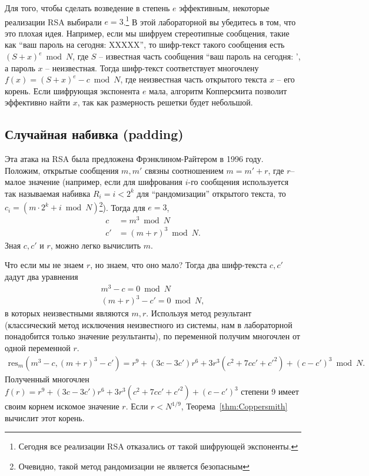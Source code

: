 \documentclass[11pt]{exam}
\theoremstyle{definition}
\begin{document}
{	Для того, чтобы сделать возведение в степень $e$ эффективным, некоторые реализации RSA выбирали $e=3$.\footnote{Сегодня все реализации RSA отказались от такой шифрующей экспоненты.} В этой лабораторной вы убедитесь в том, что это плохая идея. Например, если мы шифруем стереотипные сообщения, такие как ``ваш пароль на сегодня: XXXXX'', то шифр-текст такого сообщения есть $(S+x)^e \bmod N$, где $S$ -- известная часть сообщения ``ваш пароль на сегодня: ', а пароль $x$ -- неизвестная. Тогда шифр-текст соответствует многочлену $f(x) = (S+x)^e - c \bmod N$, где неизвестная часть открытого текста $x$ -- его корень. Если шифрующая экспонента $e$ мала, алгоритм Копперсмита позволит эффективно найти $x$, так как размерность решетки будет небольшой. 
	
	 
	\subsection{Случайная набивка (padding)}
	
	Эта атака на RSA была предложена Фрэнклином-Райтером в 1996 году.  Положим, открытые сообщения $m,m'$ связны соотношением $m = m'+r$, где $r$-- малое значение (например, если для шифрования $i$-го сообщения используется так называемая набивка $R_i = i < 2^k$ для ``рандомизации'' открытого текста, то $c_i = (m\cdot 2^k + i \bmod N)$\footnote{Очевидно, такой метод рандомизации не является безопасным}). Тогда для $e = 3$,
	\begin{align*}
		c &= m^3 \bmod N \\
		c' &=(m+r)^3 \bmod N.
	\end{align*}
	Зная $c, c'$ и $r$, можно легко вычислить $m$. 
	
	Что если мы не знаем $r$, но знаем, что оно мало? Тогда два шифр-текста $c, c'$ дадут два уравнения 
	\begin{align*}
	m^3 - c = 0 \bmod N \\
	(m+r)^3 - c' = 0\bmod N,
	\end{align*}
	в которых неизвестными являются $m,r$. Используя метод результант (классический метод исключения неизвестного из системы, нам в лабораторной понадобится только значение результанты), по переменной получим многочлен от одной переменной $r$.
	\begin{align*}
		\text{res}_m(m^3 - c, (m+r)^3 - c' ) = r^9 + (3c - 3c')r^6 + 3r^3(c^2 + 7cc'+c'^2) + (c-c')^3 \bmod N.
	\end{align*}
	Полученный многочлен $f(r)=r^9 + (3c - 3c')r^6 + 3r^3(c^2 + 7cc'+c'^2) + (c-c')^3 $ степени 9 имеет своим корнем искомое значение $r$. Если $r < N^{1/9}$, Теорема~\ref{thm:Coppersmith} вычислит этот корень.
}
\end{document}
